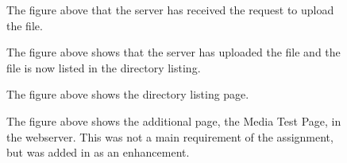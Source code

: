      \begin{figure}[!htbp]
  \caption{The figure above that the server has received the request to upload the file.}
\end{figure}
     \begin{figure}[!htbp]
  \caption{The figure above shows that the server has uploaded the file and the file is now listed in the directory listing.}
\end{figure}
     \begin{figure}[!htbp]
  \caption{The figure above shows the directory listing page.}
\end{figure}
     \begin{figure}[!htbp]
  \caption{The figure above shows the additional page, the Media Test Page, in the webserver. This was not a main requirement of the assignment, but was added in as an enhancement.}
\end{figure}
